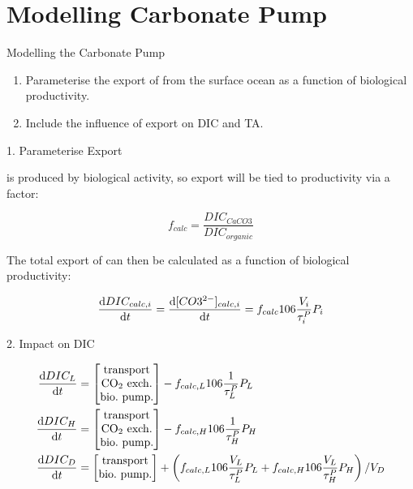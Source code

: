 \documentclass[aspectratio=169]{beamer}
\begin{document}
\section{Modelling Carbonate Pump}

\begin{frame}{Modelling the Carbonate Pump}

    \begin{enumerate}
        \item Parameterise the export of \ce{[CO3^{2-}]} from the surface ocean as a function of biological productivity.
        \item Include the influence of \ce{[CO3^{2-}]} export on DIC and TA.
    \end{enumerate}

\end{frame}


\begin{frame}{1. Parameterise  Export}

     is produced by biological activity, so export will be tied to productivity via a factor:

    $$
    f_{calc} = \frac{DIC_{CaCO3}}{DIC_{organic}}
    $$

    The total export of \ce{[CO3^{2-}]} can then be calculated as a function of biological productivity:

    $$
    \dv{DIC_{calc, i}}{t} = \dv{\ce[CO3^{2-}]_{calc, i}}{t} = f_{calc} 106 \frac{V_i}{\tau^P_i} P_i
    $$

\end{frame}

\begin{frame}{2. Impact on DIC}

    \begin{align*}
        \frac{\mathrm{d}DIC_L}{\mathrm{d}t} &= \begin{bmatrix} \mathrm{transport} \\ \mathrm{CO_2~exch.} \\ \mathrm{bio.~pump.} \end{bmatrix} - f_{calc,L} 106 \frac{1}{\tau^P_L} P_L \\
        \frac{\mathrm{d}DIC_H}{\mathrm{d}t} &= \begin{bmatrix} \mathrm{transport} \\ \mathrm{CO_2~exch.} \\ \mathrm{bio.~pump.} \end{bmatrix} - f_{calc,H} 106 \frac{1}{\tau^P_H} P_H \\
        \frac{\mathrm{d}DIC_D}{\mathrm{d}t} &= \begin{bmatrix} \mathrm{transport} \\ \mathrm{bio.~pump.} \end{bmatrix} + \left(f_{calc,L} 106 \frac{V_L}{\tau^P_L} P_L + f_{calc,H} 106 \frac{V_L}{\tau^P_H} P_H \right) / V_D
    \end{align*}

\end{frame}
\end{document}
